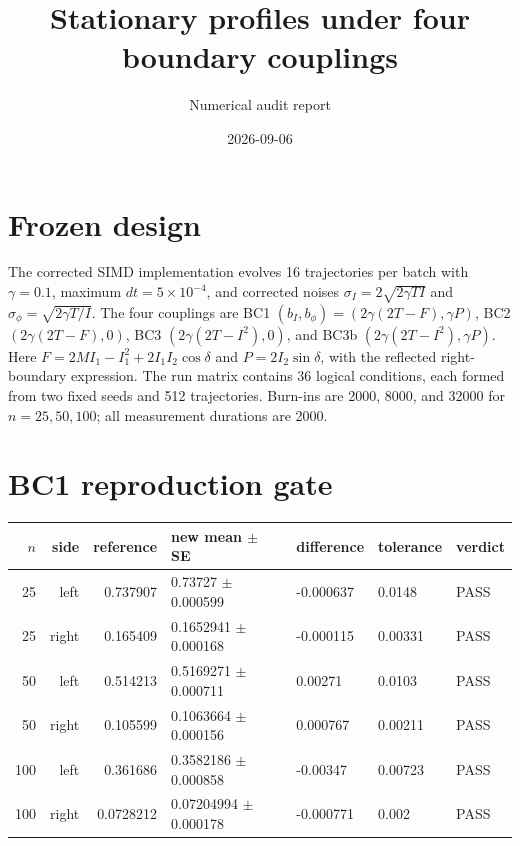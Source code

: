\documentclass[10pt]{article}
\title{Stationary profiles under four boundary couplings}
\author{Numerical audit report}
\date{2026-09-06}
\begin{document}
\maketitle

\section*{Frozen design}
The corrected SIMD implementation evolves 16 trajectories per batch with
$\gamma=0.1$, maximum $dt=5\times10^{-4}$, and corrected noises
$\sigma_I=2\sqrt{2\gamma T I}$ and
$\sigma_\phi=\sqrt{2\gamma T/I}$.  The four couplings are
BC1 $(b_I,b_\phi)=(2\gamma(2T-F),\gamma P)$,
BC2 $(2\gamma(2T-F),0)$,
BC3 $(2\gamma(2T-I^2),0)$, and
BC3b $(2\gamma(2T-I^2),\gamma P)$.
Here $F=2MI_1-I_1^2+2I_1I_2\cos\delta$ and
$P=2I_2\sin\delta$, with the reflected right-boundary expression.
The run matrix contains 36 logical conditions, each formed from two fixed seeds
and 512 trajectories. Burn-ins are 2000, 8000, and 32000 for
$n=25,50,100$; all measurement durations are 2000.

\section*{BC1 reproduction gate}
\begin{center}\small
\begin{tabular}{rrrllll}
\toprule
$n$ & side & reference & new mean $\pm$ SE & difference & tolerance & verdict\\
\midrule
25 & left & 0.737907 & 0.73727 $\pm$ 0.000599 & -0.000637 & 0.0148 & PASS \\
25 & right & 0.165409 & 0.1652941 $\pm$ 0.000168 & -0.000115 & 0.00331 & PASS \\
50 & left & 0.514213 & 0.5169271 $\pm$ 0.000711 & 0.00271 & 0.0103 & PASS \\
50 & right & 0.105599 & 0.1063664 $\pm$ 0.000156 & 0.000767 & 0.00211 & PASS \\
100 & left & 0.361686 & 0.3582186 $\pm$ 0.000858 & -0.00347 & 0.00723 & PASS \\
100 & right & 0.0728212 & 0.07204994 $\pm$ 0.000178 & -0.000771 & 0.002 & PASS \\
\bottomrule
\end{tabular}
\end{center}
\end{document}

